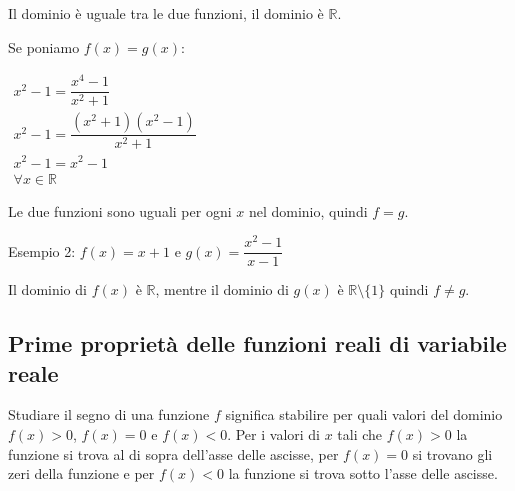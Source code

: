 \documentclass[a4paper]{article}
\theoremstyle{plain}
\theoremstyle{definition}
\theoremstyle{remark}
\newcommand{\R}{\mathbb{R}}
\newcommand{\set}[1]{\{#1\}}
\begin{document}
Il dominio è uguale tra le due funzioni, il dominio è $\R$.

Se poniamo $f(x)=g(x)$:

$\begin{array}{l}
    x^2-1=\dfrac{x^4-1}{x^2+1}\\
    x^2-1=\dfrac{(x^2+1)(x^2-1)}{x^2+1}\\
    x^2-1=x^2-1\\
    \forall x\in\R
\end{array}$

Le due funzioni sono uguali per ogni $x$ nel dominio, quindi $f=g$.

Esempio 2: $f(x)=x+1$ e $g(x)=\dfrac{x^2-1}{x-1}$

Il dominio di $f(x)$ è $\R$, mentre il dominio di $g(x)$ è $\R\setminus\set{1}$ quindi $f\ne g$.
\newpage
\subsection{Prime proprietà delle funzioni reali di variabile reale}
Studiare il segno di una funzione $f$ significa stabilire per quali valori del dominio $f(x)>0$, $f(x)=0$ e $f(x)<0$. Per i valori di $x$ tali che $f(x)>0$ la funzione si trova al di sopra dell'asse delle ascisse, per $f(x)=0$ si trovano gli zeri della funzione e per $f(x)<0$ la funzione si trova sotto l'asse delle ascisse.
\end{document}
